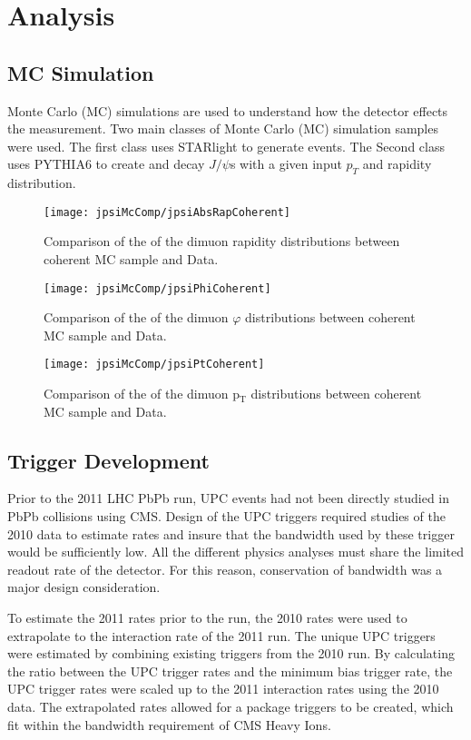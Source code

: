 \chapter{Analysis}	
  \section{\label{sec:mcSim} MC Simulation}
    Monte Carlo (MC) simulations are used to understand how the detector 
      effects the measurement.
    Two main classes of Monte Carlo (MC) simulation samples were used. 
    The first class uses STARlight to generate events. 
    The Second class uses PYTHIA6 to create and decay $J/\psi$s with a given
      input $p_{T}$ and rapidity distribution. 
    \begin{figure}[h]
      \centering
      \texttt{[image: jpsiMcComp/jpsiAbsRapCoherent]}
      \caption{Comparison of the of the dimuon rapidity distributions between 
        coherent MC sample and Data.}
      \label{fig:jpsiAbsRapCoherent}
    \end{figure}
    \begin{figure}[h]
      \centering
      \texttt{[image: jpsiMcComp/jpsiPhiCoherent]}
      \caption{Comparison of the of the dimuon $\varphi$ distributions 
        between coherent MC sample and Data.}
      \label{fig:jpsiPhiCoherent}
    \end{figure}
    \begin{figure}[h]
      \centering
      \texttt{[image: jpsiMcComp/jpsiPtCoherent]}
      \caption{Comparison of the of the dimuon p$_{\textrm{T}}$ distributions 
        between coherent MC sample and Data.}
      \label{fig:jpsiPtCoherent}
    \end{figure}

  \section{\label{sec:TrigDev} Trigger Development} 
    Prior to the 2011 LHC PbPb run, UPC events had not been directly studied in 
      PbPb collisions using CMS. 
    Design of the UPC triggers required studies of the 2010 data to estimate 
      rates and insure that the bandwidth used by these trigger would be
      sufficiently low. 
    All the different physics analyses must share the limited readout rate of 
      the detector.
    For this reason, conservation of bandwidth was a major design consideration.

    To estimate the 2011 rates prior to the run, the 2010 rates were used to 
      extrapolate to the interaction rate of the 2011 run. 
    The unique UPC triggers were estimated by combining existing triggers from
      the 2010 run. 
    By calculating the ratio between the UPC trigger rates and the minimum bias
      trigger rate, the UPC trigger rates were scaled up to the 2011 
      interaction rates using the 2010 data. 
    The extrapolated rates allowed for a package triggers to be created, which 
      fit within the bandwidth requirement of CMS Heavy Ions. 
    
